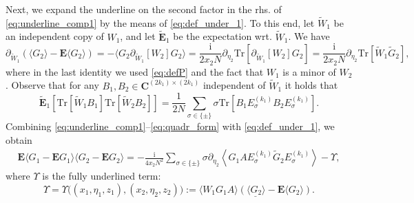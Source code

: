\documentclass[10pt]{amsart}
\numberwithin{equation}{section}
\newcommand{\E}{\mathbf{E}}
\newcommand{\C}{\mathbf{C}}
\newcommand{\ii}{\mathrm{i}}
\begin{document}
Next, we expand the underline on the second factor in the rhs. of \eqref{eq:underline_comp1} by the means of \eqref{eq:def_under_1}. To this end, let $\widetilde{W}_1$ be an independent copy of $W_1$, and let $\widetilde{\E}_1$ be the expectation wrt. $\widetilde{W}_1$. We have
\begin{equation}
\partial_{\widetilde{W}_1}\left(\langle G_2\rangle-\E\langle G_2\rangle\right) = -\langle G_2\partial_{\widetilde{W}_1}[W_2] G_2\rangle = \frac{\ii}{2x_2 N} \partial_{\eta_2} \mathrm{Tr}\left[ \partial_{\widetilde{W}_1}[W_2]G_2\right]= \frac{\ii}{2x_2 N} \partial_{\eta_2} \mathrm{Tr}\left[\widetilde{W}_1 \widetilde{G}_2\right],
\label{eq:underline_comp2}
\end{equation}
where in the last identity we used \eqref{eq:defP} and the fact that $W_1$ is a minor of $W_2$. Observe that for any $B_1,B_2\in \C^{(2k_1)\times (2k_1)}$ independent of $\widetilde{W}_1$ it holds that
\begin{equation}
\widetilde{\E}_1 \left[ \mathrm{Tr}[\widetilde{W}_1B_1]\mathrm{Tr}[\widetilde{W}_2B_2]\right] = \frac{1}{2N}\sum_{\sigma\in\{\pm\}}\sigma \mathrm{Tr}\left[ B_1E_\sigma^{(k_1)}B_2E_\sigma^{(k_1)}\right].
\label{eq:quadr_form}
\end{equation}
Combining \eqref{eq:underline_comp1}--\eqref{eq:quadr_form} with \eqref{eq:def_under_1}, we obtain
\begin{equation}
\begin{split}
\label{eq:usrel}
\E \langle G_1-\E G_1\rangle \langle G_2-\E G_2\rangle = -\frac{\ii}{4x_2 N^2} \sum_{\sigma\in\{\pm\}}\sigma\partial_{\eta_2}\left\langle G_1A E_\sigma^{(k_1)} \widetilde{G}_2 E_\sigma^{(k_1)}\right\rangle-\Upsilon,
\end{split}
\end{equation}
where $\Upsilon$ is the fully underlined term:
\begin{equation}
\Upsilon=\Upsilon\big((x_1,\eta_1,z_1),(x_2,\eta_2,z_2)\big):=\underline{\langle W_1G_1A\rangle \left(\langle G_2\rangle -\E \langle G_2\rangle\right)}.
\end{equation}
\end{document}
